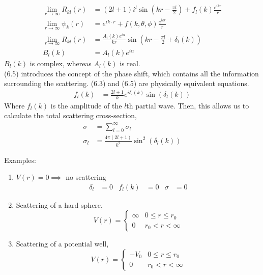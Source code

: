 \documentclass[a4paper, 11pt, normalem]{report}
\begin{document}
\begin{align}
    \lim_{r\to\infty} R_{kl}(r) &= (2l+1)i^l\sin\left(kr - \frac{\pi l}{2}\right) + f_l(k)\frac{e^{ikr}}{r} \\
    \lim_{r\to\infty} \psi_k(r) &= e^{ik\cdot r} + f(k,\theta,\phi)\frac{e^{ikr}}{r} \\
    \lim_{r\to\infty} R_{kl}(r) &= \frac{A_l(k)e^{i\alpha}}{kr}\sin\left(kr - \frac{\pi l}{2} + \delta_l(k)\right) \\
    B_l(k) &= A_l(k)e^{i\alpha}
\end{align}
$B_l(k)$ is complex, whereas $A_l(k)$ is real. \\
(6.5) introduces the concept of the phase shift, which contains all the information surrounding the scattering.
(6.3) and (6.5) are physically equivalent equations.
\begin{align}
    f_l(k) &= \frac{2l+1}{k}e^{i\delta_l(k)}\sin\left(\delta_l(k)\right)
\end{align}
Where $f_l(k)$ is the amplitude of the $l$th partial wave. 
Then, this allows us to calculate the total scattering cross-section,
\begin{align}
    \sigma &= \sum_{l=0}^\infty \sigma_l \\
    \sigma_l &= \frac{4\pi(2l+1)}{k^2}\sin^2\left(\delta_l(k)\right)
\end{align}

Examples:
\begin{enumerate}
    \item $V(r) = 0 \implies$ no scattering 
        \begin{align}
            \delta_l &= 0 & f_l(k) &= 0 & \sigma & = 0
        \end{align}
    \item Scattering of a hard sphere, 
        \begin{equation}
            V(r) = \begin{cases} \infty & 0 \leq r \leq r_0 \\ 0 & r_0 < r < \infty \end{cases}
        \end{equation}
    \item Scattering of a potential well,
        \begin{equation}
            V(r) = \begin{cases} -V_0 & 0 \leq r \leq r_0 \\ 0 & r_0 < r < \infty \end{cases}
        \end{equation}
\end{enumerate}
\end{document}
